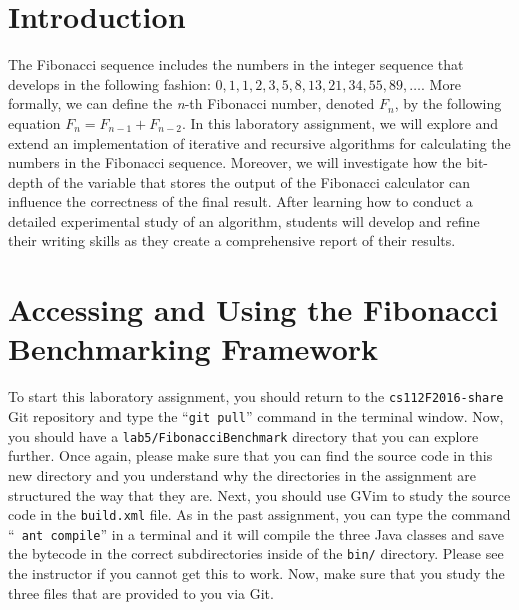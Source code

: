 

\usepackage[compact]{titlesec}


\section*{Introduction}

The Fibonacci sequence includes the numbers in the integer sequence that develops in the following fashion: $0, 1, 1,
2, 3, 5, 8, 13, 21, 34, 55, 89, \ldots$. More formally, we can define the {\em n}-th Fibonacci number, denoted $F_n$,
by the following equation $F_n = F_{n-1} + F_{n-2}$. In this laboratory assignment, we will explore and
extend an implementation of iterative and recursive algorithms for calculating the numbers in the Fibonacci sequence.
Moreover, we will investigate how the bit-depth of the variable that stores the output of the Fibonacci calculator can
influence the correctness of the final result. After learning how to conduct a detailed experimental study of an
algorithm, students will develop and refine their writing skills as they create a comprehensive report of their results.

\section*{Accessing and Using the Fibonacci Benchmarking Framework}

\begin{sloppypar}

  To start this laboratory assignment, you should return to the {\tt cs112F2016-share} Git repository and type the
  ``{\tt git pull}'' command in the terminal window.  Now, you should have a {\tt lab5/FibonacciBenchmark} directory
  that you can explore further.  Once again, please make sure that you can find the source code in this new directory
  and you understand why the directories in the assignment are structured the way that they are. Next, you should use
  GVim to study the source code in the {\tt build.xml} file.  As in the past assignment, you can type the command ``{\tt
  ant compile}'' in a terminal and it will compile the three Java classes and save the bytecode in the correct
  subdirectories inside of the {\tt bin/} directory. Please see the instructor if you cannot get this to work.  Now,
  make sure that you study the three files that are provided to you via Git.

\end{sloppypar}

